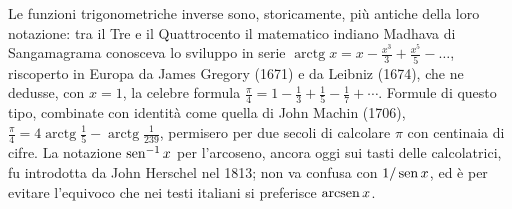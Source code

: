\begin{notastorica}[L'arcotangente e $\pi$]
Le funzioni trigonometriche inverse sono, storicamente, più antiche della loro notazione:
tra il Tre e il Quattrocento il matematico indiano Madhava di Sangamagrama conosceva lo sviluppo in
serie
$\operatorname{arctg}x=x-\frac{x^{3}}3+\frac{x^{5}}5-\dots$, riscoperto in Europa da James Gregory
(1671) e da Leibniz (1674), che ne dedusse, con $x=1$, la celebre formula
$\frac\pi4=1-\frac13+\frac15-\frac17+\cdots$. Formule di questo tipo, combinate con identità
come quella di John Machin (1706), $\frac\pi4=4\operatorname{arctg}\frac15-\operatorname{arctg}\frac1{239}$,
permisero per due secoli di calcolare $\pi$ con centinaia di cifre. La notazione
$\operatorname{sen}^{-1}x$ per l'arcoseno, ancora oggi sui tasti delle calcolatrici, fu introdotta da
John Herschel nel 1813; non va confusa con $1/\operatorname{sen} x$, ed è per evitare l'equivoco che nei
testi italiani si preferisce $\operatorname{arcsen} x$.
\end{notastorica}
